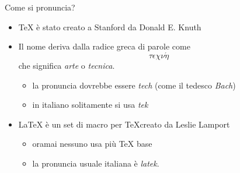 \documentclass{beamer}
\begin{document}
\begin{frame}{Come si pronuncia?}

\begin{itemize}
\item \TeX{} \`e stato creato a Stanford da Donald E. Knuth
\item Il nome deriva dalla radice greca di parole come
\textbf{\Large $$\tau\epsilon\chi\nu\acute{\eta}$$}
che significa \emph{arte} o \emph{tecnica}.
\begin{itemize}
\item la pronuncia dovrebbe essere \emph{tech} (come il tedesco \emph{Bach})
\item in italiano solitamente si usa \emph{tek}
\end{itemize}
\item \LaTeX{} \`e un set di macro per \TeX creato da Leslie Lamport

\begin{itemize}
\item oramai nessuno usa pi\`u \TeX{} base
\item la pronuncia usuale italiana \`e \emph{latek}.
\end{itemize}
\end{itemize}
\end{frame}

\end{document}
